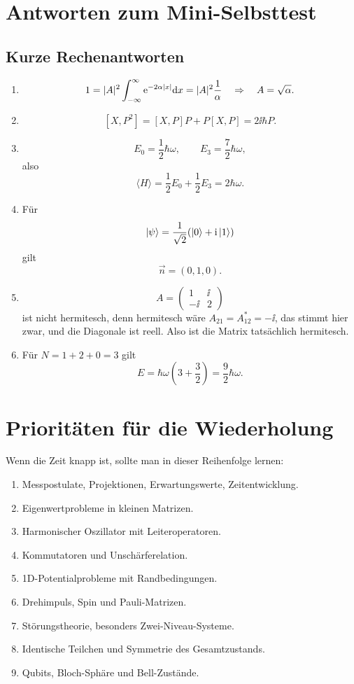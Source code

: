 \section{Antworten zum Mini-Selbsttest}

\subsection{Kurze Rechenantworten}

\begin{enumerate}
    \item
    \[
        1=|A|^2\int_{-\infty}^{\infty}\mathrm{e}^{-2\alpha|x|}\mathrm{d} x
        =|A|^2\frac{1}{\alpha}
        \quad\Rightarrow\quad
        A=\sqrt\alpha.
    \]
    \item
    \[
        [X,P^2]=[X,P]P+P[X,P]=2\ii\hbar P.
    \]
    \item
    \[
        E_0=\frac12\hbar\omega,
        \qquad
        E_3=\frac72\hbar\omega,
    \]
    also
    \[
        \langle H\rangle=\frac12E_0+\frac12E_3=2\hbar\omega.
    \]
    \item Für
    \[
        \left|\psi\right\rangle=\frac{1}{\sqrt2}(\left|0\right\rangle+\mathrm{i}\left|1\right\rangle)
    \]
    gilt
    \[
        \vec n=(0,1,0).
    \]
    \item
    \[
        A=\begin{pmatrix}1&\ii\\-\ii&2\end{pmatrix}
    \]
    ist nicht hermitesch, denn hermitesch wäre $A_{21}=A_{12}^*=-\ii$, das stimmt hier zwar, und die Diagonale ist reell. Also ist die Matrix tatsächlich hermitesch.
    \item Für $N=1+2+0=3$ gilt
    \[
        E=\hbar\omega\left(3+\frac32\right)=\frac92\hbar\omega.
    \]
\end{enumerate}

\section{Prioritäten für die Wiederholung}

\begin{notebox}
Wenn die Zeit knapp ist, sollte man in dieser Reihenfolge lernen:
\begin{enumerate}
    \item Messpostulate, Projektionen, Erwartungswerte, Zeitentwicklung.
    \item Eigenwertprobleme in kleinen Matrizen.
    \item Harmonischer Oszillator mit Leiteroperatoren.
    \item Kommutatoren und Unschärferelation.
    \item 1D-Potentialprobleme mit Randbedingungen.
    \item Drehimpuls, Spin und Pauli-Matrizen.
    \item Störungstheorie, besonders Zwei-Niveau-Systeme.
    \item Identische Teilchen und Symmetrie des Gesamtzustands.
    \item Qubits, Bloch-Sphäre und Bell-Zustände.
\end{enumerate}
\end{notebox}

